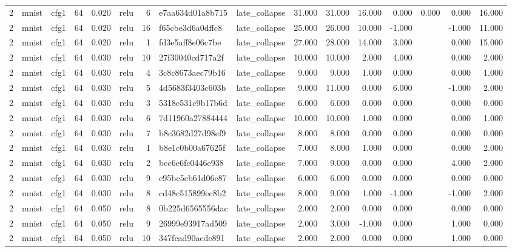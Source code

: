 \begin{table}[htbp]
{\begin{tabular}{@{}rllrrlrllrrrrrrr@{}}
2 & mnist & cfg1 & 64 & 0.020 & relu & 6 & e7aa634d01a8b715 & late\_collapse & 31.000 & 31.000 & 16.000 & 0.000 & 0.000 & 0.000 & 16.000 \\
2 & mnist & cfg1 & 64 & 0.020 & relu & 16 & f65cbe3d6a0dffc8 & late\_collapse & 25.000 & 26.000 & 10.000 & -1.000 &  & -1.000 & 11.000 \\
2 & mnist & cfg1 & 64 & 0.020 & relu & 1 & fd3e5aff8e06c7be & late\_collapse & 27.000 & 28.000 & 14.000 & 3.000 &  & 0.000 & 15.000 \\
2 & mnist & cfg1 & 64 & 0.030 & relu & 10 & 27f30040cd717a2f & late\_collapse & 10.000 & 10.000 & 2.000 & 4.000 &  & 0.000 & 2.000 \\
2 & mnist & cfg1 & 64 & 0.030 & relu & 4 & 3c8c8673aec79b16 & late\_collapse & 9.000 & 9.000 & 1.000 & 0.000 &  & 0.000 & 1.000 \\
2 & mnist & cfg1 & 64 & 0.030 & relu & 5 & 4d5683f3403c603b & late\_collapse & 9.000 & 11.000 & 0.000 & 6.000 &  & -1.000 & 2.000 \\
2 & mnist & cfg1 & 64 & 0.030 & relu & 3 & 5318e531c9b17b6d & late\_collapse & 6.000 & 6.000 & 0.000 & 0.000 &  & 0.000 & 0.000 \\
2 & mnist & cfg1 & 64 & 0.030 & relu & 6 & 7d11960a27884444 & late\_collapse & 10.000 & 10.000 & 1.000 & 0.000 &  & 0.000 & 1.000 \\
2 & mnist & cfg1 & 64 & 0.030 & relu & 7 & b8c3682d27d98ef9 & late\_collapse & 8.000 & 8.000 & 0.000 & 0.000 &  & 0.000 & 0.000 \\
2 & mnist & cfg1 & 64 & 0.030 & relu & 1 & b8e1c0b00a67625f & late\_collapse & 7.000 & 8.000 & 1.000 & 0.000 &  & 0.000 & 2.000 \\
2 & mnist & cfg1 & 64 & 0.030 & relu & 2 & bec6e6fc0446e938 & late\_collapse & 7.000 & 9.000 & 0.000 & 0.000 &  & 4.000 & 2.000 \\
2 & mnist & cfg1 & 64 & 0.030 & relu & 9 & c95bc5eb61d06e87 & late\_collapse & 6.000 & 6.000 & 0.000 & 0.000 &  & 0.000 & 0.000 \\
2 & mnist & cfg1 & 64 & 0.030 & relu & 8 & cd48c515899ec8b2 & late\_collapse & 8.000 & 9.000 & 1.000 & -1.000 &  & -1.000 & 2.000 \\
2 & mnist & cfg1 & 64 & 0.050 & relu & 8 & 0b225d6565556dac & late\_collapse & 2.000 & 2.000 & 0.000 & 0.000 &  & 0.000 & 0.000 \\
2 & mnist & cfg1 & 64 & 0.050 & relu & 9 & 26999e93917ad509 & late\_collapse & 2.000 & 3.000 & -1.000 & 0.000 &  & 1.000 & 0.000 \\
2 & mnist & cfg1 & 64 & 0.050 & relu & 10 & 347fcad90aede891 & late\_collapse & 2.000 & 2.000 & 0.000 & 0.000 &  & 1.000 & 0.000 \\

\end{tabular}}
\end{table}
